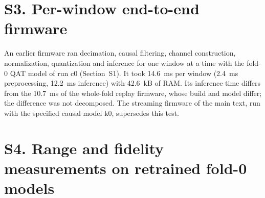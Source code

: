 \documentclass[preprint,12pt]{elsarticle}
\begin{document}
\section*{S3. Per-window end-to-end firmware}
An earlier firmware ran decimation, causal filtering, channel construction, normalization, quantization and inference for one window at a time with the fold-0 QAT model of run c0 (Section~S1). It took 14.6~ms per window (2.4~ms preprocessing, 12.2~ms inference) with 42.6~kB of RAM. Its inference time differs from the 10.7~ms of the whole-fold replay firmware, whose build and model differ; the difference was not decomposed. The streaming firmware of the main text, run with the specified causal model k0, supersedes this test.

\section*{S4. Range and fidelity measurements on retrained fold-0 models}
\end{document}
